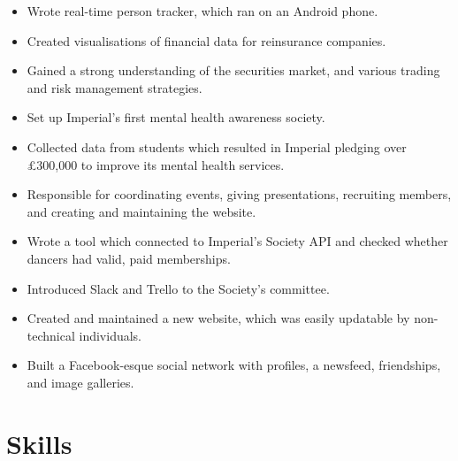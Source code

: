 \documentclass{jcgcv}
\begin{document}
\begin{column}
\begin{itemize}
  \item Wrote real-time person tracker, which ran on an Android phone.
\end{itemize}

\begin{itemize}
  \item Created visualisations of financial data for reinsurance companies.
  \item Gained a strong understanding of the securities market, and various trading and risk management strategies.
\end{itemize}

\begin{itemize}
  \item Set up Imperial's first mental health awareness society.
  \item Collected data from students which resulted in Imperial pledging over \pounds300,000 to improve its mental health services.
  \item Responsible for coordinating events, giving presentations, recruiting members, and creating and maintaining the website.
\end{itemize}

\begin{itemize}
  \item Wrote a tool which connected to Imperial's Society API and checked whether dancers had valid, paid memberships.
  \item Introduced Slack and Trello to the Society's committee.
  \item Created and maintained a new website, which was easily updatable by non-technical individuals.
\end{itemize}

\begin{itemize}
  \item Built a Facebook-esque social network with profiles, a newsfeed, friendships, and image galleries.
\end{itemize}



\section{Skills}


\end{column}
\end{document}
